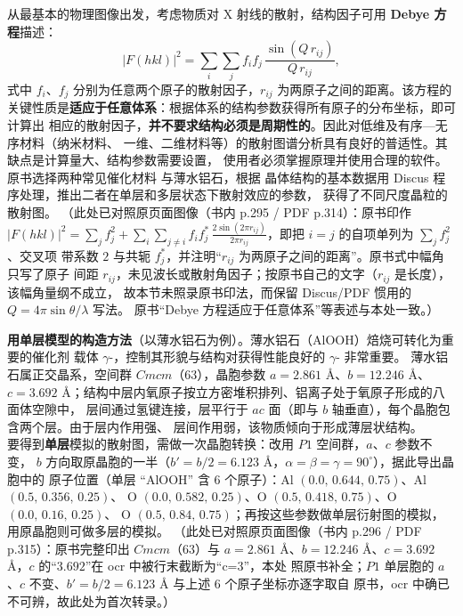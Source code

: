 \begin{principle}
从最基本的物理图像出发，考虑物质对 X 射线的散射，结构因子可用 \textbf{Debye 方程}描述：
\begin{equation}
\left|F(hkl)\right|^{2}=\sum_{i}\sum_{j}f_{i}f_{j}\,
\frac{\sin\left(Q\,r_{ij}\right)}{Q\,r_{ij}} ,
\label{eq:ch04c-debye}
\end{equation}
式中 $f_{i}$、$f_{j}$ 分别为任意两个原子的散射因子，$r_{ij}$ 为两原子之间的距离。该方程的
关键性质是\textbf{适应于任意体系}：根据体系的结构参数获得所有原子的分布坐标，即可计算出
相应的散射因子，\textbf{并不要求结构必须是周期性的}。因此对低维及有序—无序材料（纳米材料、
一维、二维材料等）的散射图谱分析具有良好的普适性。其缺点是计算量大、结构参数需要设置，
使用者必须掌握原理并使用合理的软件。原书选择两种常见催化材料  与薄水铝石，根据
晶体结构的基本数据用 \textsf{Discus} 程序处理，推出二者在单层和多层状态下散射效应的参数，
获得了不同尺度晶粒的散射图。
（此处已对照原页面图像（书内 p.295 / PDF p.314）：原书印作
$\left|F(hkl)\right|^{2}=\sum_{j}f_{j}^{2}+\sum_{i}\sum_{j\ne i}f_{i}f_{j}^{*}\,
\frac{2\sin(2\pi r_{ij})}{2\pi r_{ij}}$，即把 $i=j$ 的自项单列为 $\sum_{j}f_{j}^{2}$、交叉项
带系数 $2$ 与共轭 $f_{j}^{*}$，并注明``$r_{ij}$ 为两原子之间的距离''。原书式中幅角只写了原子
间距 $r_{ij}$，未见波长或散射角因子；按原书自己的文字（$r_{ij}$ 是长度），该幅角量纲不成立，
故本节未照录原书印法，而保留 \textsf{Discus}/PDF 惯用的 $Q=4\pi\sin\theta/\lambda$ 写法。
原书``Debye 方程适应于任意体系''等表述与本处一致。）
\end{principle}

\begin{measure}
\textbf{用单层模型的构造方法}（以薄水铝石为例）。薄水铝石（AlOOH）焙烧可转化为重要的催化剂
载体 $\gamma$-，控制其形貌与结构对获得性能良好的 $\gamma$- 非常重要。
薄水铝石属正交晶系，空间群 $Cmcm$（63），晶胞参数 $a=2.861$ Å、$b=12.246$ Å、
$c=3.692$ Å；结构中层内氧原子按立方密堆积排列、铝离子处于氧原子形成的八面体空隙中，
层间通过氢键连接，层平行于 $ac$ 面（即与 $b$ 轴垂直），每个晶胞包含两个层。由于层内作用强、
层间作用弱，该物质倾向于形成薄层状结构。\\
要得到\textbf{单层}模拟的散射图，需做一次晶胞转换：改用 $P1$ 空间群，$a$、$c$ 参数不变，
$b$ 方向取原晶胞的一半（$b'=b/2=6.123$ Å，$\alpha=\beta=\gamma=90^\circ$），据此导出晶胞中的
原子位置（单层 ``AlOOH'' 含 $6$ 个原子）：Al $(0.0,\,0.644,\,0.75)$、Al $(0.5,\,0.356,\,0.25)$、
O $(0.0,\,0.582,\,0.25)$、O $(0.5,\,0.418,\,0.75)$、O $(0.0,\,0.16,\,0.25)$、
O $(0.5,\,0.84,\,0.75)$；再按这些参数做单层衍射图的模拟，用原晶胞则可做多层的模拟。
（此处已对照原页面图像（书内 p.296 / PDF p.315）：原书完整印出 $Cmcm$（63）与
$a=2.861$ Å、$b=12.246$ Å、$c=3.692$ Å，$c$ 的``$3.692$''在 ocr 中被行末截断为``c=3''，本处
照原书补全；$P1$ 单层胞的 $a$、$c$ 不变、$b'=b/2=6.123$ Å 与上述 $6$ 个原子坐标亦逐字取自
原书，ocr 中确已不可辨，故此处为首次转录。）
\end{measure}

